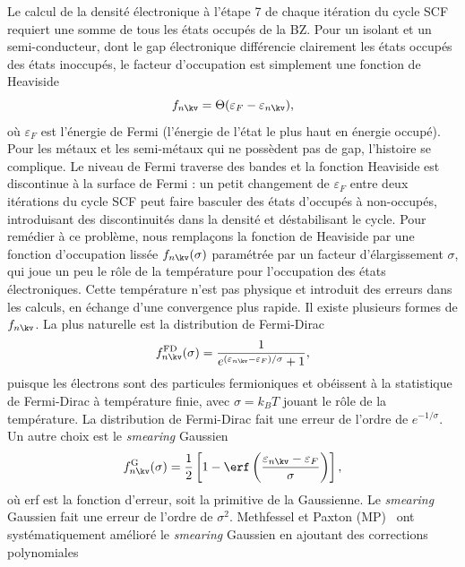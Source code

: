 Le calcul de la densité électronique à l'étape 7 de chaque itération du cycle SCF requiert une somme de tous les états occupés de la BZ. Pour un isolant et un semi-conducteur, dont le gap électronique différencie clairement les états occupés des états inoccupés, le facteur d'occupation est simplement une fonction de Heaviside
\begin{equation}
    f_ {n\kv}=\Theta(\varepsilon_F-\varepsilon_{n\kv}),
    \label{eqn:c2_smearing_heaviside}
\end{equation}
où $\varepsilon_F$ est l'énergie de Fermi (l'énergie de l'état le plus haut en énergie occupé). Pour les métaux et les semi-métaux qui ne possèdent pas de gap, l'histoire se complique. Le niveau de Fermi traverse des bandes et la fonction Heaviside est discontinue à la surface de Fermi : un petit changement de $\varepsilon_F$ entre deux itérations du cycle SCF peut faire basculer des états d'occupés à non-occupés, introduisant des discontinuités dans la densité et déstabilisant le cycle. Pour remédier à ce problème, nous remplaçons la fonction de Heaviside par une fonction d'occupation lissée $f_{n\kv}(\sigma)$ paramétrée par un facteur d'élargissement $\sigma$, qui joue un peu le rôle de la température pour l'occupation des états électroniques. Cette température n'est pas physique et introduit des erreurs dans les calculs, en échange d'une convergence plus rapide. Il existe plusieurs formes de $f_{n\kv}$. La plus naturelle est la distribution de Fermi-Dirac
\begin{equation}
    f_{n\kv}^\text{FD}(\sigma)=\frac{1}{e^{(\varepsilon_{n\kv}-\varepsilon_F)/\sigma}+1},
    \label{eqn:c2_smearing_FD}
\end{equation}
puisque les électrons sont des particules fermioniques et obéissent à la statistique de Fermi-Dirac à température finie, avec $\sigma=k_B T$ jouant le rôle de la température. La distribution de Fermi-Dirac fait une erreur de l'ordre de $e^{-1/\sigma}$. Un autre choix est le \textit{smearing} Gaussien
\begin{equation}
    f_{n\kv}^\text{G}(\sigma)=\frac{1}{2}\left[1-\erf\left(\frac{\varepsilon_{n\kv}-\varepsilon_F}{\sigma}\right)\right],
    \label{eqn:c2_smearing_gaussien}
\end{equation}
où erf est la fonction d'erreur, soit la primitive de la Gaussienne. Le \textit{smearing} Gaussien fait une erreur de l'ordre de $\sigma^2$. Methfessel et Paxton (MP)~\cite{methfesselHighprecisionSamplingBrillouinzone1989} ont systématiquement amélioré le \textit{smearing} Gaussien en ajoutant des corrections polynomiales
